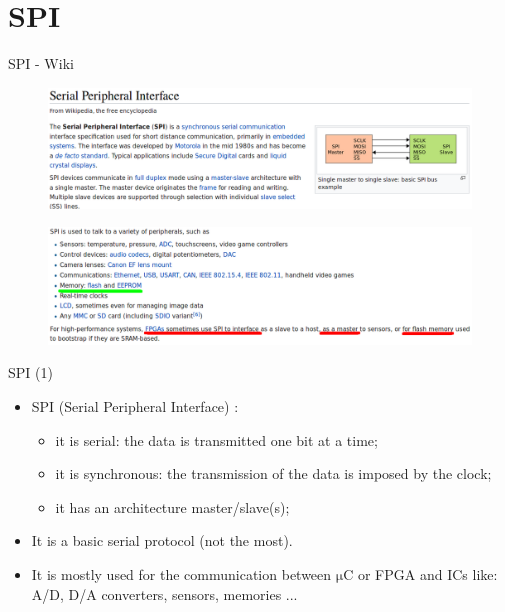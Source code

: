 \documentclass{beamer}
\begin{document}
      
    \section{SPI}
    
    \begin{frame}{SPI - Wiki}
    	\begin{figure}[!tbh]
    		\centering
    		\includegraphics*[width=1\textwidth]{images/spi_1}
    	\end{figure}   
 
     	\begin{figure}[!tbh]
     		\centering
     		\includegraphics*[width=1\textwidth]{images/spi_2}
     	\end{figure}   
     \end{frame}
     
    \begin{frame}{SPI (1)}
    	\begin{itemize}
    		\item SPI (Serial Peripheral Interface) : 
    		\begin{itemize}
    			\item it is serial: the data is transmitted one bit at a time;
    			\item it is synchronous: the transmission of the data is imposed by the clock;
    			\item it has an architecture master/slave(s);
    		\end{itemize}
    		\item It is a basic serial protocol (not the most).
    		\item It is mostly used for the communication between $\mathrm{\mu}$C or FPGA and ICs like: A/D, D/A converters, sensors, memories ...
    	\end{itemize}
    \end{frame}  
     
\end{document}
